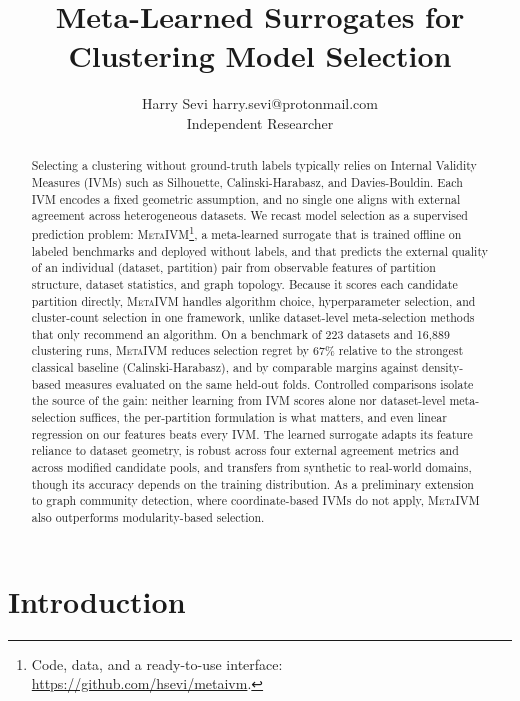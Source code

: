 \documentclass[10pt]{article} %
\title{Meta-Learned Surrogates for Clustering Model Selection}
\author{%
  \name Harry Sevi
  \email harry.sevi@protonmail.com \\
  \addr Independent Researcher%
}
\newcommand{\ours}{\textsc{MetaIVM}}
\begin{document}
\maketitle

\begin{abstract}
Selecting a clustering without ground-truth labels typically relies on Internal Validity Measures (IVMs) such as Silhouette, Calinski-Harabasz, and Davies-Bouldin. Each IVM encodes a fixed geometric assumption, and no single one aligns with external agreement across heterogeneous datasets. We recast model selection as a supervised prediction problem: \ours{}\footnote{Code, data, and a ready-to-use interface: \url{https://github.com/hsevi/metaivm}.}, a meta-learned surrogate that is trained offline on labeled benchmarks and deployed without labels, and that predicts the external quality of an individual (dataset, partition) pair from observable features of partition structure, dataset statistics, and graph topology. Because it scores each candidate partition directly, \ours{} handles algorithm choice, hyperparameter selection, and cluster-count selection in one framework, unlike dataset-level meta-selection methods that only recommend an algorithm. On a benchmark of 223 datasets and 16,889 clustering runs, \ours{} reduces selection regret by 67\% relative to the strongest classical baseline (Calinski-Harabasz), and by comparable margins against density-based measures evaluated on the same held-out folds. Controlled comparisons isolate the source of the gain: neither learning from IVM scores alone nor dataset-level meta-selection suffices, the per-partition formulation is what matters, and even linear regression on our features beats every IVM. The learned surrogate adapts its feature reliance to dataset geometry, is robust across four external agreement metrics and across modified candidate pools, and transfers from synthetic to real-world domains, though its accuracy depends on the training distribution. As a preliminary extension to graph community detection, where coordinate-based IVMs do not apply, \ours{} also outperforms modularity-based selection.
\end{abstract}

\section{Introduction}
\label{sec:intro}
\end{document}
